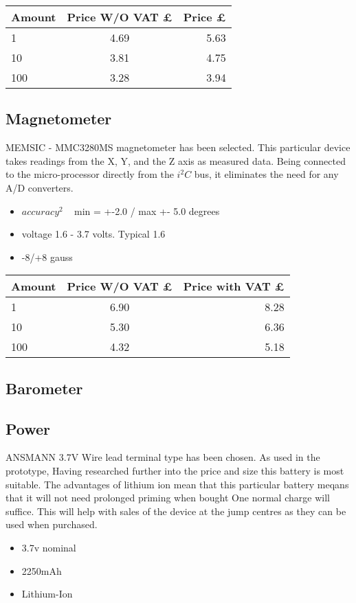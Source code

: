 \documentclass{report}
\begin{document}
\begin{center}
  \begin{tabular}{ | l | c | r |}
    \hline
    Amount & Price W/O VAT £ & Price £ \\ \hline
    1 & 4.69 & 5.63 \\ \hline
    10 & 3.81 & 4.75 \\ \hline
    100 & 3.28& 3.94  \\ \hline
  \end{tabular}
\end{center}

\subsection{Magnetometer}
MEMSIC - MMC3280MS magnetometer has been selected. This particular device takes readings from the X, Y, and the Z axis as measured data. Being connected to the micro-processor directly from the $i^2C$ bus, it eliminates the need for any A/D converters.

\begin{itemize}
\item $accuracy^2$ ~ min = +-2.0 / max +- 5.0 degrees 
\item voltage 1.6 - 3.7 volts. Typical 1.6
\item -8/+8 gauss
\end{itemize}

\begin{center}
  \begin{tabular}{ | l | c | r |}
    \hline
    Amount & Price W/O VAT £ & Price with VAT £ \\ \hline
    1 & 6.90 & 8.28 \\ \hline
    10 & 5.30 & 6.36 \\ \hline
    100 & 4.32 & 5.18 \\ \hline
	\end{tabular}
\end{center}

\subsection{Barometer}



\subsection{Power}
 ANSMANN 3.7V Wire lead terminal type has been chosen. As used in the prototype, Having researched further into the price and size this battery is most suitable. The advantages of lithium ion mean that this particular battery meqans that it will not need prolonged priming when bought One normal charge will suffice. This will help with sales of the device at the jump centres as they can be used when purchased.
\begin{itemize}
\item 3.7v nominal
\item 2250mAh
\item Lithium-Ion
\end{itemize}
\end{document}
